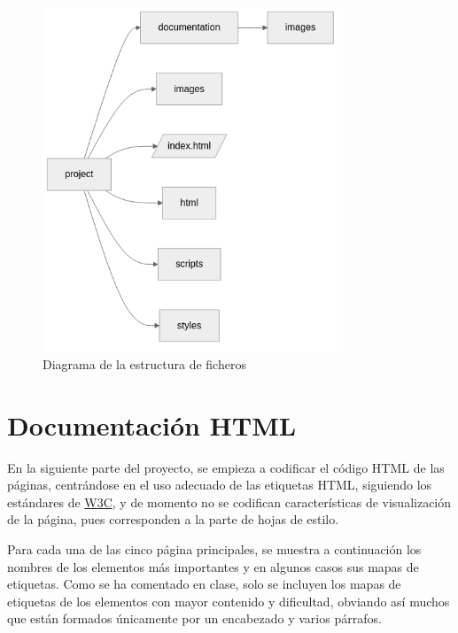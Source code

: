 \documentclass[11pt, a4paper]{book}
\begin{document}
	\begin{figure} [H]
		\centering
		\includegraphics[width=0.8\textwidth]{estructura_ficheros.png}
		\caption{Diagrama de la estructura de ficheros}
	\end{figure}
	
	
	
	
	
	
	
	
	
	
	\chapter{Documentación HTML}
	
	En la siguiente parte del proyecto, se empieza a codificar el código HTML de las páginas, centrándose en el uso adecuado de las etiquetas HTML, siguiendo los estándares de \href{https://html.spec.whatwg.org/multipage/}{W3C}, y de momento no se codifican características de visualización de la página, pues corresponden a la parte de hojas de estilo. 
	
	Para cada una de las cinco página principales, se muestra a continuación los nombres de los elementos más importantes y en algunos casos sus mapas de etiquetas. Como se ha comentado en clase, solo se incluyen los mapas de etiquetas de los elementos con mayor contenido y dificultad, obviando así muchos que están formados únicamente por un encabezado y varios párrafos.
	
\end{document}
